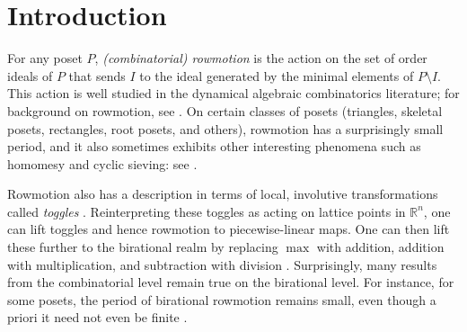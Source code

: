 \documentclass[ALCO,Unicode,published]{cedram}
\title
[Rowmotion and the octahedron recurrence]
{Birational rowmotion and the octahedron recurrence}
\author[\initial{J.} Johnson]{\firstname{Joseph} \lastname{Johnson}}
\author[\initial{R.} \middlename{I.} Liu]{\firstname{Ricky} \middlename{Ini} \lastname{Liu}}
\numberwithin{equation}{section}
\begin{document}
\begin{abstract}
We use the octahedron recurrence to give a simplified statement and proof of a formula for iterated birational rowmotion on a product of two chains, first described by Musiker and Roby. Using this, we show that weights of certain chains in rectangles shift in a predictable way under the action of rowmotion. We then define generalized Stanley--Thomas words whose cyclic rotation uniquely determines birational rowmotion on the product of two chains. We also discuss the relationship between rowmotion and birational RSK and give a birational analogue of Greene's theorem in this setting.
\end{abstract}


\maketitle


\section{Introduction}

For any poset $P$, \emph{(combinatorial) rowmotion} is the action on the set of order ideals of $P$ that sends $I$ to the ideal generated by the minimal elements of $P \setminus I$. This action is well studied in the dynamical algebraic combinatorics literature; for background on rowmotion, see \cite{strikerwilliams}. %
On certain classes of posets (triangles, skeletal posets, rectangles, root posets, and others), rowmotion has a surprisingly small period, and it also sometimes exhibits other interesting phenomena such as homomesy and cyclic sieving: see \cite{einsteinpropp1,hopkins3,josephroby1,musikerroby,propproby,thomaswilliams}.

Rowmotion also has a description in terms of local, involutive transformations called \emph{toggles} \cite{cameronfonderflaass}. Reinterpreting these toggles as acting on lattice points in $\mathbb R^n$, one can lift toggles and hence rowmotion to piecewise-linear maps. One can then lift these further to the birational realm by replacing $\max$ with addition, addition with multiplication, and subtraction with division \cite{einsteinpropp2,einsteinpropp1}. Surprisingly, many results from the combinatorial level remain true on the birational level. For instance, for some posets, the period of birational rowmotion remains small, even though a priori it need not even be finite \cite{grinbergroby2,grinbergroby1}.
\end{document}
